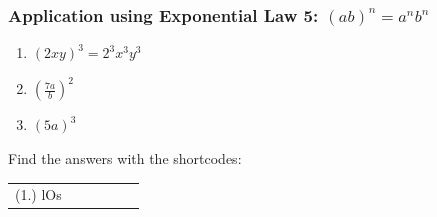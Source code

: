            \subsubsection{ Application using Exponential Law 5: ${\left(ab\right)}^{n}={a}^{n}{b}^{n}$ }
            \nopagebreak
        \label{m38359*id66288}\begin{enumerate}[noitemsep, label=\textbf{\arabic*}. ] 
            \label{m38359*uid31}\item 
            ${\left(2xy\right)}^{3}={2}^{3}{x}^{3}{y}^{3}$
      \label{m38359*uid32}\item 
        ${\left(\frac{7a}{b}\right)}^{2}$
      \label{m38359*uid33}\item 
        ${\left(5a\right)}^{3}$
\newline
\newline
          \end{enumerate}
      \label{m38359*uid34}
\par {} Find the answers with the shortcodes:
 \par \begin{tabular}[h]{cccccc}
 (1.) lOs  & \end{tabular}
